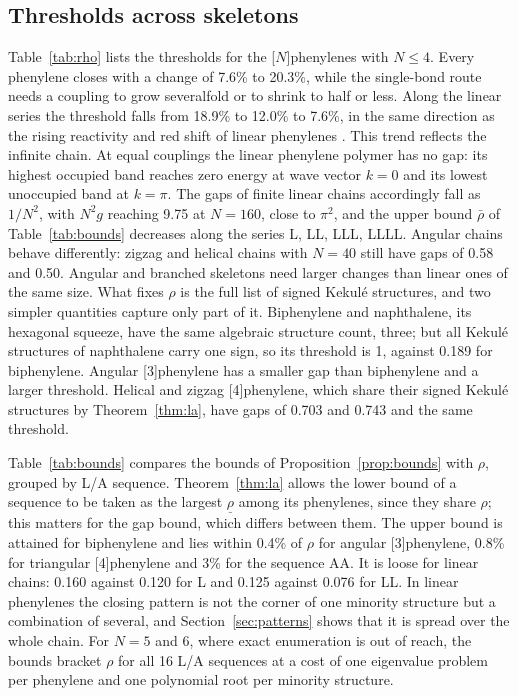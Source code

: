 \documentclass[11pt]{article}
\begin{document}
\subsection{Thresholds across skeletons}

Table~\ref{tab:rho} lists the thresholds for the [$N$]phenylenes with $N\le4$. Every phenylene closes with a change of 7.6\% to 20.3\%, while the single-bond route needs a coupling to grow severalfold or to shrink to half or less. Along the linear series the threshold falls from 18.9\% to 12.0\% to 7.6\%, in the same direction as the rising reactivity and red shift of linear phenylenes \citep{Vollhardt1993,Dosche2002}. This trend reflects the infinite chain. At equal couplings the linear phenylene polymer has no gap: its highest occupied band reaches zero energy at wave vector $k=0$ and its lowest unoccupied band at $k=\pi$. The gaps of finite linear chains accordingly fall as $1/N^2$, with $N^2g$ reaching 9.75 at $N=160$, close to $\pi^2$, and the upper bound $\bar\rho$ of Table~\ref{tab:bounds} decreases along the series L, LL, LLL, LLLL. Angular chains behave differently: zigzag and helical chains with $N=40$ still have gaps of 0.58 and 0.50. Angular and branched skeletons need larger changes than linear ones of the same size. What fixes $\rho$ is the full list of signed Kekul\'e structures, and two simpler quantities capture only part of it. Biphenylene and naphthalene, its hexagonal squeeze, have the same algebraic structure count, three; but all Kekul\'e structures of naphthalene carry one sign, so its threshold is 1, against 0.189 for biphenylene. Angular [3]phenylene has a smaller gap than biphenylene and a larger threshold. Helical and zigzag [4]phenylene, which share their signed Kekul\'e structures by Theorem~\ref{thm:la}, have gaps of 0.703 and 0.743 and the same threshold.

Table~\ref{tab:bounds} compares the bounds of Proposition~\ref{prop:bounds} with $\rho$, grouped by L/A sequence. Theorem~\ref{thm:la} allows the lower bound of a sequence to be taken as the largest $\underline\rho$ among its phenylenes, since they share $\rho$; this matters for the gap bound, which differs between them. The upper bound is attained for biphenylene and lies within 0.4\% of $\rho$ for angular [3]phenylene, 0.8\% for triangular [4]phenylene and 3\% for the sequence AA. It is loose for linear chains: 0.160 against 0.120 for L and 0.125 against 0.076 for LL. In linear phenylenes the closing pattern is not the corner of one minority structure but a combination of several, and Section~\ref{sec:patterns} shows that it is spread over the whole chain. For $N=5$ and 6, where exact enumeration is out of reach, the bounds bracket $\rho$ for all 16 L/A sequences at a cost of one eigenvalue problem per phenylene and one polynomial root per minority structure.
\end{document}
